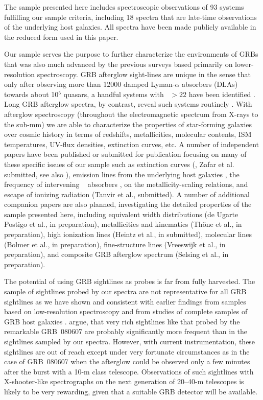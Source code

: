 \documentclass[longauth]{aa}    %
\begin{document}
The sample presented here includes spectroscopic observations of 93 systems
fulfilling our sample criteria, including 18 spectra that are late-time
observations of the underlying host galaxies. All spectra have been made
publicly available in the reduced form used in this paper.

Our sample serves the purpose to further characterize the environments of GRBs
that was also much advanced by the previous surveys based primarily on
lower-resolution spectroscopy. GRB afterglow sight-lines are unique in the
sense that only after observing more than 12000 damped Lyman-$\alpha$ absorbers
(DLAs) towards about 10$^5$ quasars, a handful systems with \nh~$ > 22$ have been
identified \citep[e.g., five in][]{Noterdaeme2012b}. Long GRB afterglow spectra,
by contrast, reveal such systems routinely \citep[][and this
work]{Jakobsson2006b, Fynbo2009, Cucchiara2015}. With afterglow spectroscopy
(throughout the electromagnetic spectrum from X-rays to the sub-mm) we are able
to characterize the properties of star-forming galaxies over cosmic history in
terms of redshifts, metallicities, molecular contents, ISM temperatures, UV-flux
densities, extinction curves, etc.  A number of independent papers have been
published or submitted for publication focusing on many of these specific issues
of our sample such as extinction curves (\citealt{Japelj2015}, Zafar et al.
submitted, see also \citealt{Fynbo2014, Heintz2017a}), emission lines from the
underlying host galaxies \citep{Kruhler2015}, the frequency of intervening
\mgii~ absorbers \citep{Christensen2017}, \citet{Arabsalmani2018} on the
metallicity-scaling relations, and escape of ionizing radiation (Tanvir et al.,
submitted). A number of additional companion papers are also planned,
investigating the detailed properties of the sample presented here, including
equivalent width distributions (de Ugarte Postigo et al., in preparation),
metallicities and kinematics (Th{\"o}ne et al., in preparation), high ionization
lines (Heintz et al., in submitted), molecular lines (Bolmer et al., in
preparation), fine-structure lines (Vreeswijk et al., in preparation), and
composite GRB afterglow spectrum (Selsing et al., in preparation).

The potential of using GRB sightlines as probes is far from fully harvested. The
sample of sightlines probed by our spectra are not representative for all GRB
sightlines as we have shown and consistent with earlier findings from samples
based on low-resolution spectroscopy \citep[e.g.,][]{Fynbo2009} and from studies
of complete samples of GRB host galaxies \citep{Hjorth2012, Covino2013,
	Perley2016a}. \cite{Kruhler2013} argue, that very rich sightlines like that
probed by the remarkable GRB~080607 \citep{Prochaska2009, Sheffer2009, Perley2011} are
probably significantly more frequent than in the sightlines sampled by our
spectra. However, with current instrumentation, these sightlines are out of
reach except under very fortunate circumstances as in the case of GRB~080607
when the afterglow could be observed only a few minutes after the burst with a
10-m class telescope. Observations of such sightlines with X-shooter-like
spectrographs on the next generation of 20--40-m telescopes is likely to be very
rewarding, given that a suitable GRB detector will be available.
\end{document}
